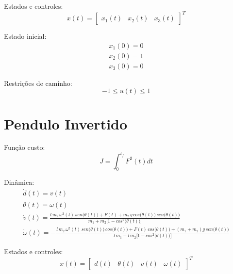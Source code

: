\documentclass[10pt,a4paper]{article}
\begin{document}
	Estados e controles:
	\begin{equation}
		x(t) = \begin{bmatrix} x_1(t) & x_2(t) & x_3(t) \end{bmatrix}^T
	\end{equation}
	
	Estado inicial:
	\begin{equation}
		\begin{gathered}
			x_1(0) = 0 \\
			x_2(0) = 1 \\
			x_3(0) = 0 
		\end{gathered}
	\end{equation}
	
	Restrições de caminho:
	\begin{equation}
		-1 \leq u(t) \leq 1
	\end{equation}
	
	
	\section{Pendulo Invertido}
	
	Função custo:
	\begin{equation}
		J = \int_{0}^{t_f} F^2(t) dt
	\end{equation}
	

	Dinâmica: 
	\begin{equation}
		\begin{gathered}
			\dot{d}(t) = v(t) \\
			\dot{\theta}(t) = \omega(t) \\
			\dot{v}(t) = \frac{l \, m_2 \, \omega^2(t) \, sen \big(\theta(t)\big) + F(t) + m_2 \, g \, cos \big(\theta(t)\big) \, sen\big(\theta(t)\big)}{m_1 + m_2 \big[1 - cos^2 \big(\theta(t) \big)\big]} \\
			\dot{\omega}(t) = -\frac{l \, m_2 \, \omega^2(t) \, sen\big(\theta(t)\big) \, cos\big(\theta(t)\big) + F(t) \, cos\big( \theta(t) \big) + (m_1 + m_2) g \, sen\big(\theta(t)\big)}{l \, m_1 + l \, m_2 \big[1 - cos^2\big(\theta(t)\big) \big]}
		\end{gathered}
	\end{equation}
	
	Estados e controles:
	\begin{equation}
		x(t) = \begin{bmatrix} d(t) & \theta(t) & v(t) & \omega(t) \end{bmatrix}^T
	\end{equation}
	
\end{document}
